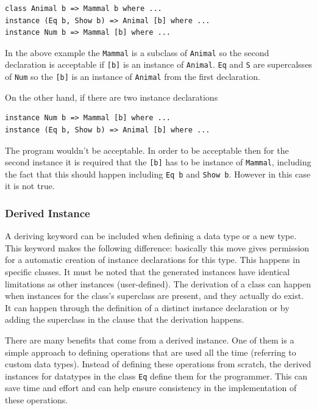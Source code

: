 \documentclass[a4paper, titlepage, twoside]{article}
\begin{document}
\begin{verbatim}
class Animal b => Mammal b where ...
instance (Eq b, Show b) => Animal [b] where ...
instance Num b => Mammal [b] where ...
\end{verbatim}

In the above example the \texttt{Mammal} is a subclass of \texttt{Animal} so the second declaration is acceptable if \texttt{[b]} is an instance of \texttt{Animal}. \texttt{Eq} and \texttt{S} are supercalsses of \texttt{Num} so the \texttt{[b]} is an instance of \texttt{Animal} from the first declaration.

On the other hand, if there are two instance declarations

\begin{verbatim}
instance Num b => Mammal [b] where ...
instance (Eq b, Show b) => Animal [b] where ...
\end{verbatim}

The program wouldn't be acceptable. In order to be acceptable then for the second instance it is required that the \texttt{[b]} has to be instance of \texttt{Mammal}, including the fact that this should happen including \texttt{Eq b} and \texttt{Show b}. However in this case it is not true.

\subsubsection{Derived Instance}
\label{sec:org262582e}

A deriving keyword can be included when defining a data type or a new type. This keyword makes the following difference: basically this move gives permission for a automatic creation of instance declarations for this type. This happens in specific classes. It must be noted that the generated instances have identical limitations as other instances (user-defined). The derivation of a class can happen when instances for the class’s superclass are present, and they actually do exist. It can happen through the definition of a distinct instance declaration or by adding the superclass in the clause that the derivation happens.

There are many benefits that come from a derived instance. One of them is a simple approach to defining operations that are used all the time (referring to custom data types). Instead of defining these operations from scratch, the derived instances for datatypes in the class \texttt{Eq} define them for the programmer. This can save time and effort and can help ensure consistency in the implementation of these operations.
\end{document}
